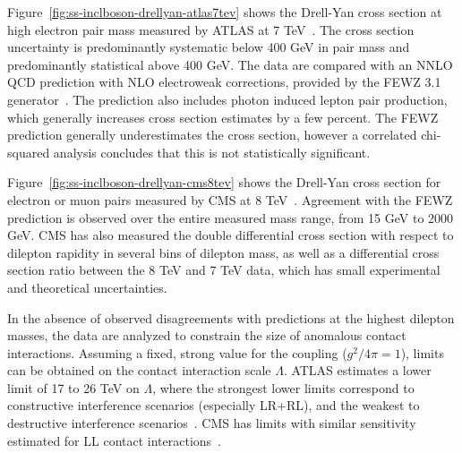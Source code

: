 Figure~\ref{fig:ss-inclboson-drellyan-atlas7tev} shows the Drell-Yan cross
section at high electron pair mass measured by ATLAS at 7 TeV~\cite{Aad:2013iua}.
The cross section uncertainty is predominantly systematic below 400 GeV in pair
mass and predominantly statistical above 400 GeV.  The data are compared with an NNLO QCD
prediction with NLO electroweak corrections, provided by the FEWZ 3.1 generator~\cite{FEWZ}.
The prediction also includes photon induced lepton pair production, which generally
increases cross section estimates by a few percent. The FEWZ prediction generally underestimates the cross section,
however a correlated chi-squared analysis concludes that this is not statistically significant.

Figure~\ref{fig:ss-inclboson-drellyan-cms8tev} shows the Drell-Yan cross section for electron or muon pairs
measured by CMS at 8 TeV~\cite{CMS:2014jea}.  Agreement with the FEWZ prediction is observed over the
entire measured mass range, from 15 GeV to 2000 GeV.  CMS has also measured the double differential
cross section with respect to dilepton rapidity in several bins of dilepton mass, as well as a differential
cross section ratio between the 8 TeV and 7 TeV data, which has small experimental and theoretical uncertainties.

In the absence of observed disagreements with predictions at the highest dilepton masses, the data are analyzed
to constrain the size of anomalous contact interactions. Assuming a fixed, strong value for the coupling ($g^2/4\pi = 1$),
limits can be obtained on the contact interaction scale $\Lambda$.  ATLAS estimates a lower limit of 17 to 26 TeV on $\Lambda$, where the
strongest lower limits correspond to constructive interference scenarios (especially LR+RL), and the weakest to destructive interference scenarios~\cite{Aad:2014wca}.
CMS has limits with similar sensitivity estimated for LL contact interactions~\cite{Khachatryan:2014fba}.



